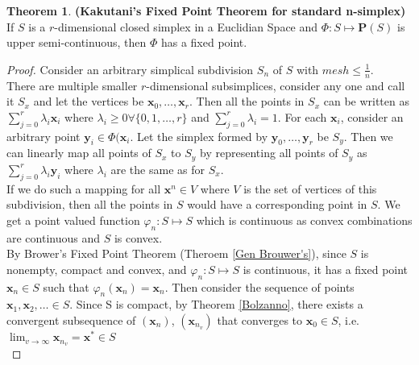\documentclass{article}
\theoremstyle{definition}
\newtheorem{theorem}{Theorem}[section]
\begin{document}
\begin{theorem}
\label{Kakutani}
\textbf{(Kakutani's Fixed Point Theorem for standard n-simplex)} If $S$ is a $r$-dimensional closed simplex in a Euclidian Space and $\Phi:S\mapsto \mathbf{P}(S)$ is upper semi-continuous, then $\Phi$ has a fixed point.
\end{theorem}
\begin{proof}
Consider an arbitrary simplical subdivision $S_n$ of $S$ with $mesh \leq \frac{1}{n}$.\\
There are multiple smaller $r$-dimensional subsimplices, consider any one and call it $S_x$ and let the vertices be $\mathbf{x}_0,\dots,\mathbf{x}_r$. Then all the points in $S_x$ can be written as $\sum_{j=0}^r \lambda_i\mathbf{x}_i$ where $\lambda_i\geq 0 \forall \{0,1,\dots,r\}$ and $\sum_{j=0}^r \lambda_i = 1$. For each $\mathbf{x}_i$, consider an arbitrary point $\mathbf{y}_i \in \Phi(\mathbf{x}_i$. Let the simplex formed by $\mathbf{y}_0,\dots,\mathbf{y}_r$ be $S_y$. Then we can linearly map all points of $S_x$ to $S_y$ by representing all points of $S_y$ as $\sum_{j=0}^r \lambda_i\mathbf{y}_i$ where $\lambda_i$ are the same as for $S_x$.\\
If we do such a mapping for all $\mathbf{x}^n\in V$ where $V$ is the set of vertices of this subdivision, then all the points in $S$ would have a corresponding point in $S$. We get a point valued function $\varphi_n: S\mapsto S$ which is continuous as convex combinations are continuous and $S$ is convex.\\
By Brower's Fixed Point Theorem (Theroem \ref{Gen Brouwer's}), since $S$ is nonempty, compact and convex, and $\varphi_n:S\mapsto S$ is continuous, it has a fixed point $\mathbf{x}_n\in S$ such that $\varphi_n(\mathbf{x}_n) = \mathbf{x}_n$. Then consider the sequence of points $\mathbf{x}_1,\mathbf{x}_2,\dots \in S$. Since S is compact, by Theorem \ref{Bolzanno}, there exists a convergent subsequence of $(\mathbf{x}_n)$, $(\mathbf{x}_{n_v})$ that converges to $\mathbf{x}_0 \in S$, i.e. $\lim_{v\to \infty} \mathbf{x}_{n_v} = \mathbf{x}^* \in S$\\


\end{proof}
\end{document}
